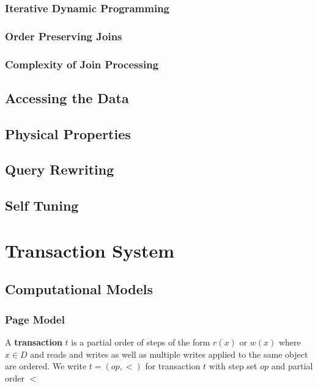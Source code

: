 \documentclass[11pt]{article}
\begin{document}
\subsubsection{Iterative Dynamic Programming}
\label{sec:org3df476e}
\subsubsection{Order Preserving Joins}
\label{sec:orge1f9f59}
\subsubsection{Complexity of Join Processing}
\label{sec:org7294a03}
\subsection{Accessing the Data}
\label{sec:orgbcaec38}

\subsection{Physical Properties}
\label{sec:org7dafe52}

\subsection{Query Rewriting}
\label{sec:orgf98a768}

\subsection{Self Tuning}
\label{sec:org64013cd}
\section{Transaction System}
\label{sec:orgf7864c5}
\subsection{Computational Models}
\label{sec:org6a6af7a}
\subsubsection{Page Model}
\label{sec:org728e96c}
\begin{definition}
A \textbf{transaction} \(t\) is a partial order of steps of the form \(r(x)\) or \(w(x)\)
where \(x\in D\) and reads and writes as well as multiple writes applied to the same object are
ordered. We write \(t=(op,<)\) for transaction \(t\) with step set \(op\) and partial order \(<\)
\end{definition}
\end{document}
